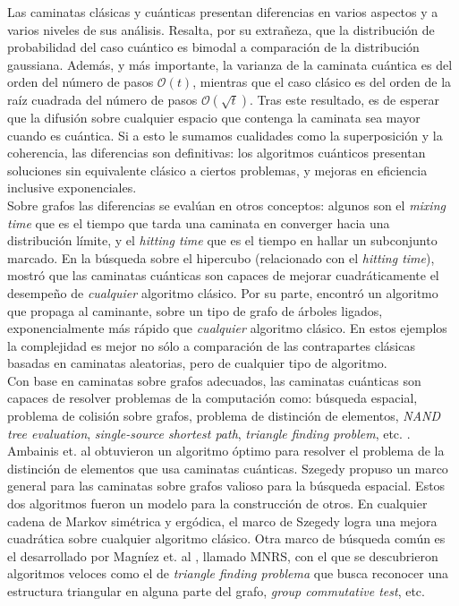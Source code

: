 Las caminatas clásicas y cuánticas presentan diferencias en varios aspectos y a varios niveles de sus análisis. Resalta, por su extrañeza, que la distribución de probabilidad del caso cuántico es bimodal a comparación de la distribución gaussiana. Además, y más importante, la varianza de la caminata cuántica es del orden del número de pasos $\mathcal{O}(t)$, mientras que el caso clásico es del orden de la raíz cuadrada del número de pasos $\mathcal{O}(\sqrt{t})$. Tras este resultado, es de esperar que la difusión sobre cualquier espacio que contenga la caminata sea mayor cuando es cuántica. Si a esto le sumamos cualidades como la superposición y la coherencia, las diferencias son definitivas: los algoritmos cuánticos presentan soluciones sin equivalente clásico a ciertos problemas, y mejoras en eficiencia inclusive exponenciales.\\

Sobre grafos las diferencias se evalúan en otros conceptos: algunos son el \textit{mixing time} que es el tiempo que tarda una caminata en converger hacia una distribución límite, y el \textit{hitting time} que es el tiempo en hallar un subconjunto marcado. En la búsqueda sobre el hipercubo (relacionado con el \textit{hitting time}), \cite{shenvi2003quantum} mostró que las caminatas cuánticas son capaces de mejorar cuadráticamente el desempeño de \textit{cualquier} algoritmo clásico. Por su parte, \cite{childs2003exponential} encontró un algoritmo que propaga al caminante, sobre un tipo de grafo de árboles ligados, exponencialmente más rápido que \textit{cualquier} algoritmo clásico. En estos ejemplos la complejidad es mejor no sólo a comparación de las contrapartes clásicas basadas en caminatas aleatorias, pero de cualquier tipo de algoritmo.\\

Con base en caminatas sobre grafos adecuados, las caminatas cuánticas son capaces de resolver problemas de la computación como: búsqueda espacial, problema de colisión sobre grafos, problema de distinción de elementos, \textit{NAND tree evaluation}, \textit{single-source shortest path},   \textit{triangle finding problem}, etc. \cite{shao}. Ambainis et. al \cite{ambainis2007quantum} obtuvieron un algoritmo óptimo para resolver el problema de la distinción de elementos que usa caminatas cuánticas. Szegedy \cite{szegedy2004quantum} propuso un marco general para las caminatas sobre grafos valioso para la búsqueda espacial. Estos dos algoritmos fueron un modelo para la construcción de otros. En cualquier cadena de Markov simétrica y ergódica, el marco de Szegedy logra una mejora cuadrática sobre cualquier algoritmo clásico. Otra marco de búsqueda común es el desarrollado por Magníez et. al \cite{magniez2011search}, llamado MNRS, con el que se descubrieron algoritmos veloces como el de \textit{triangle finding problema} que busca reconocer una estructura triangular en alguna parte del grafo, \textit{group commutative test}, etc.\\

